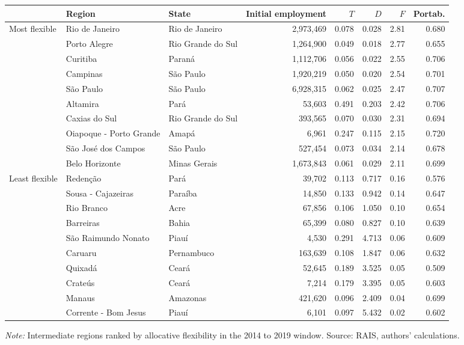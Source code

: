 {\footnotesize
\setlength{\tabcolsep}{3.5pt}
\begin{threeparttable}
\begin{tabular}{lllrrrrr}
\toprule
 & Region & State & Initial employment & $T$ & $D$ & $F$ & Portab. \\
\midrule
Most flexible & Rio de Janeiro & Rio de Janeiro & 2,973,469 & 0.078 & 0.028 & 2.81 & 0.680 \\
 & Porto Alegre & Rio Grande do Sul & 1,264,900 & 0.049 & 0.018 & 2.77 & 0.655 \\
 & Curitiba & Paraná & 1,112,706 & 0.056 & 0.022 & 2.55 & 0.706 \\
 & Campinas & São Paulo & 1,920,219 & 0.050 & 0.020 & 2.54 & 0.701 \\
 & São Paulo & São Paulo & 6,928,315 & 0.062 & 0.025 & 2.47 & 0.707 \\
 & Altamira & Pará & 53,603 & 0.491 & 0.203 & 2.42 & 0.706 \\
 & Caxias do Sul & Rio Grande do Sul & 393,565 & 0.070 & 0.030 & 2.31 & 0.694 \\
 & Oiapoque - Porto Grande & Amapá & 6,961 & 0.247 & 0.115 & 2.15 & 0.720 \\
 & São José dos Campos & São Paulo & 527,454 & 0.073 & 0.034 & 2.14 & 0.678 \\
 & Belo Horizonte & Minas Gerais & 1,673,843 & 0.061 & 0.029 & 2.11 & 0.699 \\
\addlinespace[3pt]
Least flexible & Redenção & Pará & 39,702 & 0.113 & 0.717 & 0.16 & 0.576 \\
 & Sousa - Cajazeiras & Paraíba & 14,850 & 0.133 & 0.942 & 0.14 & 0.647 \\
 & Rio Branco & Acre & 67,856 & 0.106 & 1.050 & 0.10 & 0.654 \\
 & Barreiras & Bahia & 65,399 & 0.080 & 0.827 & 0.10 & 0.639 \\
 & São Raimundo Nonato & Piauí & 4,530 & 0.291 & 4.713 & 0.06 & 0.609 \\
 & Caruaru & Pernambuco & 163,639 & 0.108 & 1.847 & 0.06 & 0.632 \\
 & Quixadá & Ceará & 52,645 & 0.189 & 3.525 & 0.05 & 0.509 \\
 & Crateús & Ceará & 7,214 & 0.179 & 3.395 & 0.05 & 0.603 \\
 & Manaus & Amazonas & 421,620 & 0.096 & 2.409 & 0.04 & 0.699 \\
 & Corrente - Bom Jesus & Piauí & 6,101 & 0.097 & 5.432 & 0.02 & 0.602 \\
\bottomrule
\end{tabular}
\begin{tablenotes}[flushleft]\footnotesize
\item \textit{Note:} Intermediate regions ranked by allocative flexibility in the 2014 to 2019 window. Source: RAIS, authors' calculations.
\end{tablenotes}
\end{threeparttable}
}
